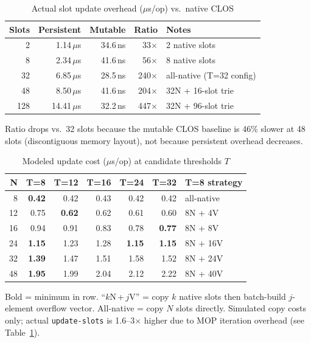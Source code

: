 \documentclass[sigconf,nonacm]{acmart}
\begin{document}
\begin{table}[htbp]
\small
\caption{Actual slot update overhead ($\mu$s/op) vs.\ native CLOS}
\label{tab:micro-update}
\begin{threeparttable}
\begin{tabular}{rrrrl}
\toprule
\textbf{Slots} & \textbf{Persistent} & \textbf{Mutable} & \textbf{Ratio} & \textbf{Notes} \\
\midrule
2   & 1.14\,$\mu$s & 34.6\,ns &  33$\times$ & 2 native slots \\
8   & 2.34\,$\mu$s & 41.6\,ns &  56$\times$ & 8 native slots \\
32  & 6.85\,$\mu$s & 28.5\,ns & 240$\times$ & all-native (T=32 config) \\
48  & 8.50\,$\mu$s & 41.6\,ns & 204$\times$\tnote{a} & 32N + 16-slot trie \\
128 & 14.41\,$\mu$s & 32.2\,ns & 447$\times$ & 32N + 96-slot trie \\
\bottomrule
\end{tabular}
\begin{tablenotes}
  \footnotesize
  \item[a] Ratio drops vs.\ 32 slots because the mutable CLOS baseline is 46\% slower at 48 slots (discontiguous memory layout), not because persistent overhead decreases.
\end{tablenotes}
\end{threeparttable}
\end{table}

\begin{table}[htbp]
\small
\caption{Modeled update cost ($\mu$s/op) at candidate thresholds $T$}
\label{tab:threshold-update}
\begin{threeparttable}
\begin{tabular}{rrrrrrl}
\toprule
\textbf{N} & \textbf{T=8} & \textbf{T=12} & \textbf{T=16} & \textbf{T=24} & \textbf{T=32} & \textbf{T=8 strategy} \\
\midrule
 8 & \textbf{0.42} & 0.42 & 0.43 & 0.42 & 0.42 & all-native \\
12 & 0.75 & \textbf{0.62} & 0.62 & 0.61 & 0.60 & 8N + 4V \\
16 & 0.94 & 0.91 & 0.83 & 0.78 & \textbf{0.77} & 8N + 8V \\
24 & \textbf{1.15} & 1.23 & 1.28 & \textbf{1.15} & \textbf{1.15} & 8N + 16V \\
32 & \textbf{1.39} & 1.47 & 1.51 & 1.58 & 1.52 & 8N + 24V \\
48 & \textbf{1.95} & 1.99 & 2.04 & 2.12 & 2.22 & 8N + 40V \\
\bottomrule
\end{tabular}
\begin{tablenotes}
  \footnotesize
  \item Bold = minimum in row. ``$k$N\,+\,$j$V'' = copy $k$ native slots then
        batch-build $j$-element overflow vector. All-native = copy $N$ slots directly.
        Simulated copy costs only; actual \texttt{update-slots} is 1.6--3$\times$ higher
        due to MOP iteration overhead (see Table~\ref{tab:micro-update}).
\end{tablenotes}
\end{threeparttable}
\end{table}
\end{document}
